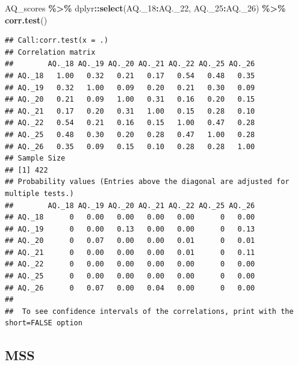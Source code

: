 \documentclass[
]{article}
\newenvironment{Shaded}{\begin{snugshade}}{\end{snugshade}}
\newcommand{\AttributeTok}[1]{\textcolor[rgb]{0.13,0.29,0.53}{#1}}
\newcommand{\FunctionTok}[1]{\textcolor[rgb]{0.13,0.29,0.53}{\textbf{#1}}}
\newcommand{\NormalTok}[1]{#1}
\newcommand{\OtherTok}[1]{\textcolor[rgb]{0.56,0.35,0.01}{#1}}
\newcommand{\SpecialCharTok}[1]{\textcolor[rgb]{0.81,0.36,0.00}{\textbf{#1}}}
\newcommand{\StringTok}[1]{\textcolor[rgb]{0.31,0.60,0.02}{#1}}
\begin{document}
\begin{Shaded}
\begin{Highlighting}[]
\NormalTok{AQ\_scores }\SpecialCharTok{\%\textgreater{}\%}\NormalTok{ dplyr}\SpecialCharTok{::}\FunctionTok{select}\NormalTok{(AQ.\_18}\SpecialCharTok{:}\NormalTok{AQ.\_22, AQ.\_25}\SpecialCharTok{:}\NormalTok{AQ.\_26) }\SpecialCharTok{\%\textgreater{}\%} \FunctionTok{corr.test}\NormalTok{()}
\end{Highlighting}
\end{Shaded}

\begin{verbatim}
## Call:corr.test(x = .)
## Correlation matrix 
##        AQ._18 AQ._19 AQ._20 AQ._21 AQ._22 AQ._25 AQ._26
## AQ._18   1.00   0.32   0.21   0.17   0.54   0.48   0.35
## AQ._19   0.32   1.00   0.09   0.20   0.21   0.30   0.09
## AQ._20   0.21   0.09   1.00   0.31   0.16   0.20   0.15
## AQ._21   0.17   0.20   0.31   1.00   0.15   0.28   0.10
## AQ._22   0.54   0.21   0.16   0.15   1.00   0.47   0.28
## AQ._25   0.48   0.30   0.20   0.28   0.47   1.00   0.28
## AQ._26   0.35   0.09   0.15   0.10   0.28   0.28   1.00
## Sample Size 
## [1] 422
## Probability values (Entries above the diagonal are adjusted for multiple tests.) 
##        AQ._18 AQ._19 AQ._20 AQ._21 AQ._22 AQ._25 AQ._26
## AQ._18      0   0.00   0.00   0.00   0.00      0   0.00
## AQ._19      0   0.00   0.13   0.00   0.00      0   0.13
## AQ._20      0   0.07   0.00   0.00   0.01      0   0.01
## AQ._21      0   0.00   0.00   0.00   0.01      0   0.11
## AQ._22      0   0.00   0.00   0.00   0.00      0   0.00
## AQ._25      0   0.00   0.00   0.00   0.00      0   0.00
## AQ._26      0   0.07   0.00   0.04   0.00      0   0.00
## 
##  To see confidence intervals of the correlations, print with the short=FALSE option
\end{verbatim}

\subsection{MSS}\label{mss}

\begin{Shaded}
\end{Shaded}
\end{document}

